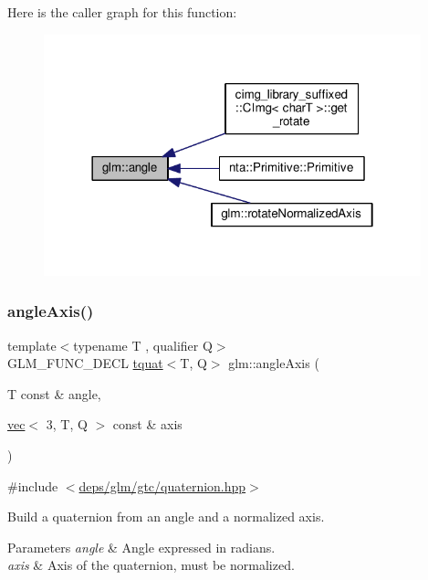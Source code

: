 Here is the caller graph for this function\+:
\nopagebreak
\begin{figure}[H]
\begin{center}
\leavevmode
\includegraphics[width=310pt]{d5/d66/group__gtc__quaternion_gaaee6c856cae3217d274a240238cb6373_icgraph}
\end{center}
\end{figure}
\mbox{\label{group__gtc__quaternion_ga93856b8bfcdd5b9a164248df3149476c}} 
\subsubsection{\texorpdfstring{angle\+Axis()}{angleAxis()}}
{\footnotesize\ttfamily template$<$typename T , qualifier Q$>$ \\
G\+L\+M\+\_\+\+F\+U\+N\+C\+\_\+\+D\+E\+CL \hyperlink{structglm_1_1tquat}{tquat}$<$T, Q$>$ glm\+::angle\+Axis (\begin{DoxyParamCaption}\item[{T const \&}]{angle,  }\item[{\hyperlink{structglm_1_1vec}{vec}$<$ 3, T, Q $>$ const \&}]{axis }\end{DoxyParamCaption})}



{\ttfamily \#include $<$\hyperlink{gtc_2quaternion_8hpp}{deps/glm/gtc/quaternion.\+hpp}$>$}

Build a quaternion from an angle and a normalized axis.


\begin{DoxyParams}{Parameters}
{\em angle} & Angle expressed in radians. \\
\hline
{\em axis} & Axis of the quaternion, must be normalized. \\
\hline
\end{DoxyParams}

